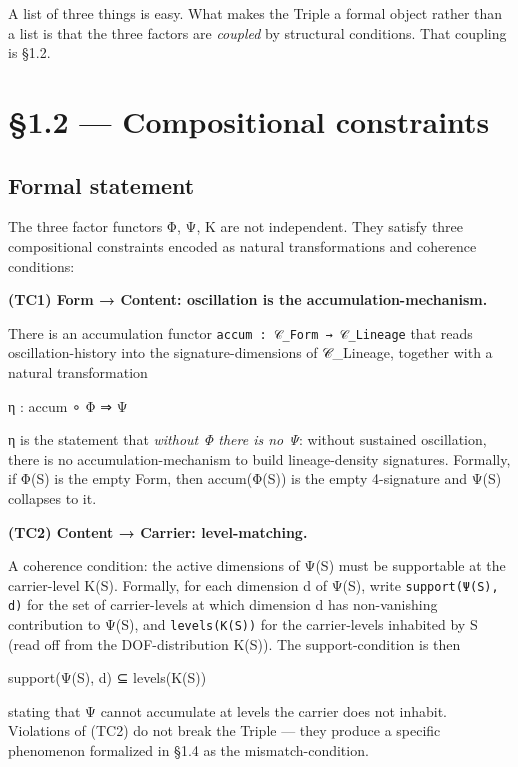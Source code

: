\documentclass[11pt, openany]{book}
\newcommand{\sectionbreak}{\clearpage}
\begin{document}
A list of three things is easy. What makes the Triple a formal object rather than a list is that the three factors are \textit{coupled} by structural conditions. That coupling is §1.2.

\sectionbreak

\section{§1.2 --- Compositional constraints}

\subsection{Formal statement}

The three factor functors Φ, Ψ, Κ are not independent. They satisfy three compositional constraints encoded as natural transformations and coherence conditions:

\textbf{(TC1) Form → Content: oscillation is the accumulation-mechanism.}

There is an accumulation functor \texttt{accum : 𝒞\_Form → 𝒞\_Lineage} that reads oscillation-history into the signature-dimensions of 𝒞\_\allowbreak{}Lineage, together with a natural transformation

\begin{Code}
η : accum ∘ Φ ⇒ Ψ
\end{Code}

η is the statement that \textit{without Φ there is no Ψ}: without sustained oscillation, there is no accumulation-mechanism to build lineage-density signatures. Formally, if Φ(S) is the empty Form, then accum(Φ(S)) is the empty 4-signature and Ψ(S) collapses to it.

\textbf{(TC2) Content → Carrier: level-matching.}

A coherence condition: the active dimensions of Ψ(S) must be supportable at the carrier-level Κ(S). Formally, for each dimension d of Ψ(S), write \texttt{support(Ψ(S), d)} for the set of carrier-levels at which dimension d has non-vanishing contribution to Ψ(S), and \texttt{levels(Κ(S))} for the carrier-levels inhabited by S (read off from the DOF-distribution Κ(S)). The support-condition is then

\begin{Code}
support(Ψ(S), d) ⊆ levels(Κ(S))
\end{Code}

stating that Ψ cannot accumulate at levels the carrier does not inhabit. Violations of (TC2) do not break the Triple --- they produce a specific phenomenon formalized in §1.4 as the mismatch-condition.
\end{document}

